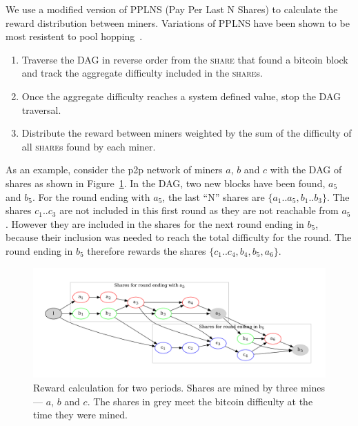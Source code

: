 \documentclass{article}
\begin{document}
We use a modified version of PPLNS (Pay Per Last N Shares) to
calculate the reward distribution between miners. Variations of PPLNS
have been shown to be most resistent to pool
hopping~\cite{rosenfeld2011analysis}.

\begin{enumerate}
\item Traverse the DAG in reverse order from the \textsc{share} that
  found a bitcoin block and track the aggregate difficulty included in
  the \textsc{share}s.
\item Once the aggregate difficulty reaches a system defined value,
  stop the DAG traversal.
\item Distribute the reward between miners weighted by the sum of the
  difficulty of all \textsc{share}s found by each miner.
\end{enumerate}

As an example, consider the p2p network of miners $a$, $b$ and $c$
with the DAG of shares as shown in
Figure~\ref{fig:reward-calculation}. In the DAG, two new blocks have
been found, $a_5$ and $b_5$. For the round ending with $a_5$, the last
``N'' shares are $\{a_1..a_5, b_1..b_3\}$. The shares $c_1..c_3$ are
not included in this first round as they are not reachable from
$a_5$. However they are included in the shares for the next round
ending in $b_5$, because their inclusion was needed to reach the total
difficulty for the round. The round ending in $b_5$ therefore rewards
the shares $\{c_1..c_4, b_4, b_5, a_6\}$.

\begin{figure}
  \begin{center}
    \includegraphics[width=1.0\textwidth]{reward-calculation}
    \caption{Reward calculation for two periods. Shares are mined by
      three mines --- $a$, $b$ and $c$. The shares in grey meet the
      bitcoin difficulty at the time they were
      mined.}\label{fig:reward-calculation}
  \end{center}
\end{figure}
\end{document}
